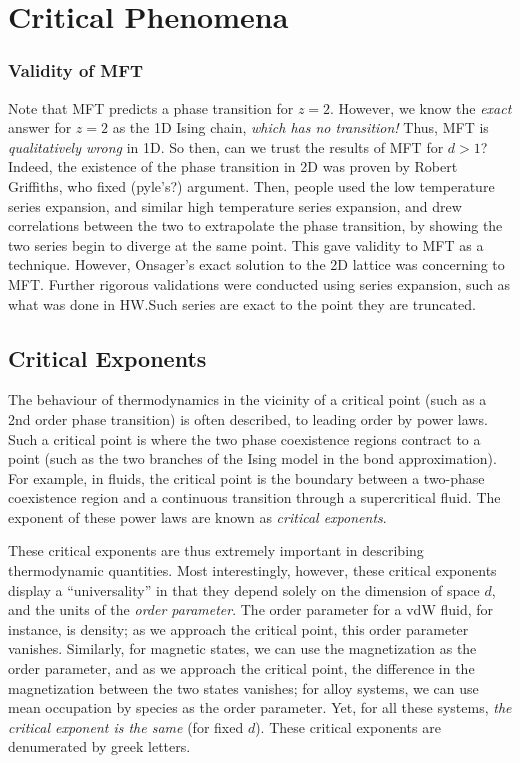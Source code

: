 \chapter{Critical Phenomena}
\subsection{Validity of MFT}
Note that MFT predicts a phase transition for \(z=2\). However, we know the \emph{exact} answer for \(z=2\) as the 1D Ising chain, \emph{which has no transition!} Thus, MFT is \emph{qualitatively wrong} in 1D. So then, can we trust the results of MFT for \(d>1\)? Indeed, the existence of the phase transition in 2D was proven by Robert Griffiths, who fixed (pyle's?) argument. Then, people used the low temperature series expansion, and similar high temperature series expansion, and drew correlations between the two to extrapolate the phase transition, by showing the two series begin to diverge at the same point. This gave validity to MFT as a technique. However, Onsager's exact solution to the 2D lattice was concerning to MFT.\@
Further rigorous validations were conducted using series expansion, such as what was done in HW.\@ Such series are exact to the point they are truncated.
\section{Critical Exponents}
The behaviour of thermodynamics in the vicinity of a critical point (such as a 2nd order phase transition) is often described, to leading order by power laws. Such a critical point is where the two phase coexistence regions contract to a point (such as the two branches of the Ising model in the bond approximation). For example, in fluids, the critical point is the boundary between a two-phase coexistence region and a continuous transition through a supercritical fluid. The exponent of these power laws are known as \emph{critical exponents}.

These critical exponents are thus extremely important in describing thermodynamic quantities. Most interestingly, however, these critical exponents display a ``universality'' in that they depend solely on the dimension of space \(d\), and the units of the \emph{order parameter}. The order parameter for a vdW fluid, for instance, is density; as we approach the critical point, this order parameter vanishes. Similarly, for magnetic states, we can use the magnetization as the order parameter, and as we approach the critical point, the difference in the magnetization between the two states vanishes; for alloy systems, we can use mean occupation by species as the order parameter. Yet, for all these systems, \emph{the critical exponent is the same} (for fixed \(d\)). These critical exponents are denumerated by greek letters.  

